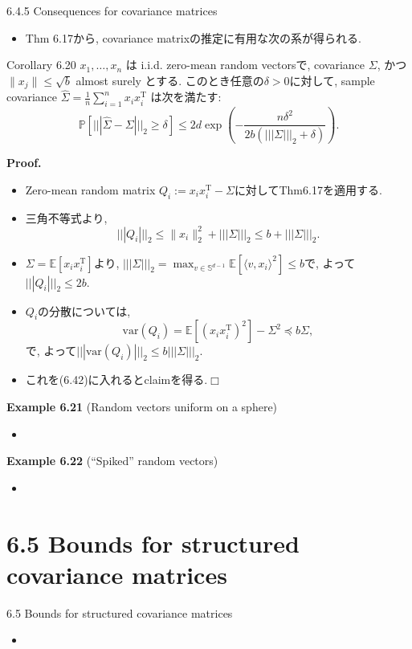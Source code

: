 \documentclass[unicode,aspectratio=169,11pt]{beamer}
\def\qed{\hfill $\Box$}
\newcommand{\ex}{\mathbb{E}}
\newcommand{\var}{\mathrm{var}}
\newcommand{\bb}{\mathbb}
\newcommand{\tr}{\mathrm{T}}
\begin{document}
\begin{frame}{6.4.5 Consequences for covariance matrices}{}
  \begin{itemize}
    \item Thm 6.17から, covariance matrixの推定に有用な次の系が得られる.
  \end{itemize}
  \begin{block}{Corollary 6.20}
    $x_1, \dots, x_n$ は i.i.d. zero-mean random vectorsで, covariance $\Sigma$, かつ $\| x_j \| \le \sqrt{b}$ almost surely とする.
    このとき任意の$\delta > 0$に対して, sample covariance $\widehat{\Sigma} = \frac{1}{n}\sum_{i=1}^n x_i x_i^{\tr}$ は次を満たす:
    \[
      \mathbb{P}\left[|||\widehat{\Sigma} - \Sigma|||_{2} \geq \delta\right]
      \leq 2 d \exp \left(-\frac{n \delta^{2}}{2 b\left(|||\Sigma|||_{2}+\delta\right)}\right).
      \tag{6.49}
    \]
  \end{block}
\end{frame}

\begin{frame}{}{}
  {\bf Proof.}
  \begin{itemize}
    \item Zero-mean random matrix $Q_i := x_i x_i^\tr - \Sigma$に対してThm6.17を適用する.
    \item 三角不等式より,
          \[
            ||| Q_i |||_2 \le \| x_i\|_2^2 + |||\Sigma|||_2 \le b + |||\Sigma|||_2.
          \]
    \item $\Sigma = \ex[x_i x_i^\tr]$より, $||| \Sigma|||_2 = \max_{v \in \bb{S}^{d-1}}\ex[\langle v, x_i\rangle^2] \le b$で, よって$|||Q_i|||_2 \le 2b$.
    \item $Q_i$の分散については,
          \[
            \var(Q_i)
            = \ex[(x_ix_i^\tr)^2] - \Sigma^2
            \preceq b\Sigma,
          \]
          で, よって$||| \var(Q_i)|||_2 \le b|||\Sigma|||_2$.
    \item これを(6.42)に入れるとclaimを得る.\qed
  \end{itemize}
\end{frame}

\begin{frame}{}{}
  {\bf Example 6.21} (Random vectors uniform on a sphere)
  \begin{itemize}
    \item 
  \end{itemize}
\end{frame}

\begin{frame}{}{}
  {\bf Example 6.22} (``Spiked'' random vectors)
  \begin{itemize}
    \item 
  \end{itemize}
\end{frame}

\section{6.5 Bounds for structured covariance matrices}
\begin{frame}{6.5 Bounds for structured covariance matrices}{}
  \begin{itemize}
    \item 
  \end{itemize}
\end{frame}
\end{document}

